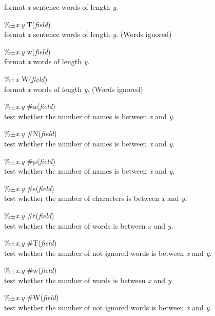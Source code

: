 \documentclass[a4paper]{article}
\newenvironment{FlatList}{\begin{list}{}{%
      \topsep=0pt\itemsep=0pt\parsep=0pt\let\makelabel=\flatlistlabel}}{\end{list}}%
\newcommand\flatlistlabel[1]{\descriptionlabel{\textsf{#1}}}
\begin{document}
\begin{multicols}{4}
\begin{FlatList}
    format \textit{x}\/ sentence words of length \textit{y}.
  \item [\%$\pm $\textit{x}.\textit{y}\/ T(\textit{field}\/)]\ \\
    format \textit{x}\/ sentence words  of length \textit{y}. (Words ignored)
  \item [\%$\pm $\textit{x}.\textit{y}\/ w(\textit{field}\/)]\ \\
    format \textit{x}\/ words of length \textit{y}.
  \item [\%$\pm $\textit{x}\/ W(\textit{field}\/)]\ \\
    format \textit{x}\/ words of length \textit{y}. (Words ignored)
  \item [\%$\pm $\textit{x}.\textit{y}\/ \#n(\textit{field}\/)]\ \\
    test whether the  number of names is between \textit{x}\/ and \textit{y}.
  \item [\%$\pm $\textit{x}.\textit{y}\/ \#N(\textit{field}\/)]\ \\
    test whether the  number of names is between \textit{x}\/ and \textit{y}.
  \item [\%$\pm $\textit{x}.\textit{y}\/ \#p(\textit{field}\/)]\ \\
    test whether the  number of names is between \textit{x}\/ and \textit{y}.
  \item [\%$\pm $\textit{x}.\textit{y}\/ \#s(\textit{field}\/)]\ \\
    test whether the  number of characters is between \textit{x}\/ and \textit{y}.
  \item [\%$\pm $\textit{x}.\textit{y}\/ \#t(\textit{field}\/)]\ \\
    test whether the  number of words is between \textit{x}\/ and \textit{y}.
  \item [\%$\pm $\textit{x}.\textit{y}\/ \#T(\textit{field}\/)]\ \\
    test whether the  number of not ignored words is between \textit{x}\/
    and \textit{y}. 
  \item [\%$\pm $\textit{x}.\textit{y}\/ \#w(\textit{field}\/)]\ \\
    test whether the  number of words is between \textit{x}\/ and \textit{y}.
  \item [\%$\pm $\textit{x}.\textit{y}\/ \#W(\textit{field}\/)]\ \\
    test whether the  number of not ignored words is between \textit{x}\/
    and \textit{y}. 
  \end{FlatList} 


\end{multicols}
\end{document}
